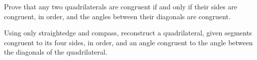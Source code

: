 Prove that any two quadrilaterals are congruent if and only if
their sides are congruent, in order,
and the angles between their diagonals are congruent.

Using only straightedge and compass,
reconstruct a quadrilateral,
given segments congruent to its four sides, in order,
and an angle congruent to the angle between the diagonals of the quadrilateral.
